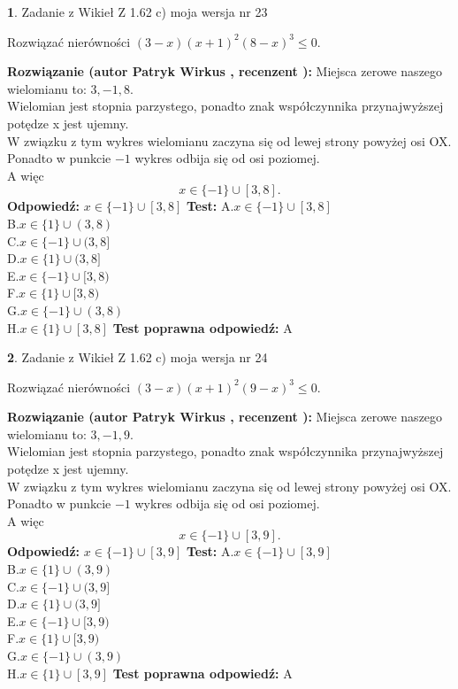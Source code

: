 \documentclass[12pt, a4paper]{article}
\theoremstyle{definition} %
\newtheorem{zad}{}
\newcommand{\zadStart}[1]{\begin{zad}#1\newline}
\newcommand{\zadStop}{\end{zad}}
\newcommand{\rozwStart}[2]{\noindent \textbf{Rozwiązanie (autor #1 , recenzent #2): }\newline}
\newcommand{\rozwStop}{\newline}
\newcommand{\odpStart}{\noindent \textbf{Odpowiedź:}\newline}
\newcommand{\odpStop}{\newline}
\newcommand{\testStart}{\noindent \textbf{Test:}\newline}
\newcommand{\testStop}{\newline}
\newcommand{\kluczStart}{\noindent \textbf{Test poprawna odpowiedź:}\newline}
\newcommand{\kluczStop}{\newline}
\begin{document}
\zadStart{Zadanie z Wikieł Z 1.62 c) moja wersja nr 23}

Rozwiązać nierówności $(3-x)(x+1)^{2}(8-x)^{3}\le0$.
\zadStop
\rozwStart{Patryk Wirkus}{}
Miejsca zerowe naszego wielomianu to: $3, -1, 8$.\\
Wielomian jest stopnia parzystego, ponadto znak współczynnika przy\linebreak najwyższej potędze x jest ujemny.\\ W związku z tym wykres wielomianu zaczyna się od lewej strony powyżej osi OX.\\
Ponadto w punkcie $-1$ wykres odbija się od osi poziomej.\\
A więc $$x \in \{-1\} \cup [3,8].$$
\rozwStop
\odpStart
$x \in \{-1\} \cup [3,8]$
\odpStop
\testStart
A.$x \in \{-1\} \cup [3,8]$\\
B.$x \in \{1\} \cup (3,8)$\\
C.$x \in \{-1\} \cup (3,8]$\\
D.$x \in \{1\} \cup (3,8]$\\
E.$x \in \{-1\} \cup [3,8)$\\
F.$x \in \{1\} \cup [3,8)$\\
G.$x \in \{-1\} \cup (3,8)$\\
H.$x \in \{1\} \cup [3,8]$
\testStop
\kluczStart
A
\kluczStop



\zadStart{Zadanie z Wikieł Z 1.62 c) moja wersja nr 24}

Rozwiązać nierówności $(3-x)(x+1)^{2}(9-x)^{3}\le0$.
\zadStop
\rozwStart{Patryk Wirkus}{}
Miejsca zerowe naszego wielomianu to: $3, -1, 9$.\\
Wielomian jest stopnia parzystego, ponadto znak współczynnika przy\linebreak najwyższej potędze x jest ujemny.\\ W związku z tym wykres wielomianu zaczyna się od lewej strony powyżej osi OX.\\
Ponadto w punkcie $-1$ wykres odbija się od osi poziomej.\\
A więc $$x \in \{-1\} \cup [3,9].$$
\rozwStop
\odpStart
$x \in \{-1\} \cup [3,9]$
\odpStop
\testStart
A.$x \in \{-1\} \cup [3,9]$\\
B.$x \in \{1\} \cup (3,9)$\\
C.$x \in \{-1\} \cup (3,9]$\\
D.$x \in \{1\} \cup (3,9]$\\
E.$x \in \{-1\} \cup [3,9)$\\
F.$x \in \{1\} \cup [3,9)$\\
G.$x \in \{-1\} \cup (3,9)$\\
H.$x \in \{1\} \cup [3,9]$
\testStop
\kluczStart
A
\kluczStop
\end{document}
